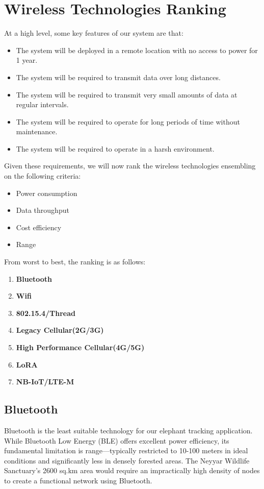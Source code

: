 \section{Wireless Technologies Ranking}

At a high level, some key features of our system are that:
\begin{itemize}
    \item The system will be deployed in a remote location with no access to power for 1 year.
    \item The system will be required to transmit data over long distances.
    \item The system will be required to transmit very small amounts of data at regular intervals.
    \item The system will be required to operate for long periods of time without maintenance.
    \item The system will be required to operate in a harsh environment.
\end{itemize}

Given these requirements, we will now rank the wireless technologies ensembling on the following criteria:
\begin{itemize}
    \item Power consumption
    \item Data throughput
    \item Cost efficiency
    \item Range
\end{itemize}

From worst to best, the ranking is as follows:
\begin{enumerate}
    \item \textbf{Bluetooth}
    \item \textbf{Wifi}
    \item \textbf{802.15.4/Thread}
    \item \textbf{Legacy Cellular(2G/3G)}
    \item \textbf{High Performance Cellular(4G/5G)}
    \item \textbf{LoRA}
    \item \textbf{NB-IoT/LTE-M}
\end{enumerate}

\subsection{Bluetooth}
Bluetooth is the least suitable technology for our elephant tracking application. While Bluetooth Low Energy (BLE) offers excellent power efficiency, its fundamental limitation is range—typically restricted to 10-100 meters in ideal conditions and significantly less in densely forested areas. The Neyyar Wildlife Sanctuary's 2600 sq.km area would require an impractically high density of nodes to create a functional network using Bluetooth.

